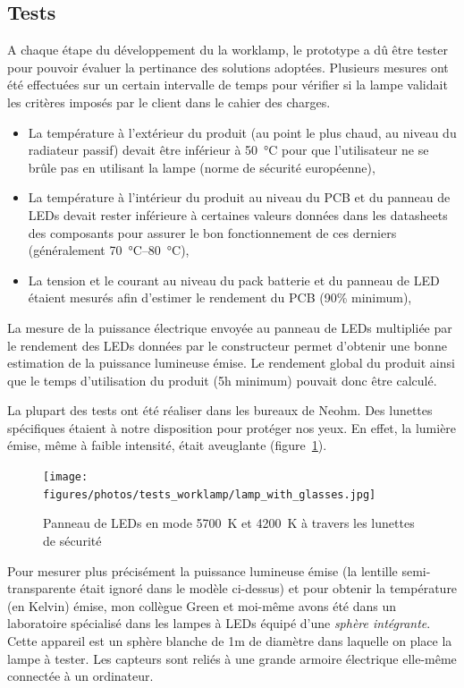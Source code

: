 \documentclass[a4paper, 12pt]{report}
\begin{document}
\subsection{Tests}
A chaque étape du développement du la worklamp, le prototype a dû  être tester pour pouvoir évaluer la pertinance des solutions adoptées. Plusieurs mesures ont été effectuées sur un certain intervalle de temps pour vérifier si la lampe validait les critères imposés par le client dans le cahier des charges.
\begin{itemize} %
\item La température à l'extérieur du produit (au point le plus chaud, au niveau du radiateur passif) devait être inférieur à \SI{50}{\celsius} pour que l'utilisateur ne se brûle pas en utilisant la lampe (norme de sécurité européenne),
\item La température à l'intérieur du produit au niveau du PCB et du panneau de LEDs devait rester inférieure à certaines valeurs données dans les datasheets des composants pour assurer le bon fonctionnement de ces derniers (généralement \SIrange{70}{80}{\celsius}),
\item La tension et le courant au niveau du pack batterie et du panneau de LED étaient mesurés afin d'estimer le rendement du PCB (90\% minimum),
\end{itemize}
La mesure de la puissance électrique envoyée au panneau de LEDs multipliée par le rendement des LEDs données par le constructeur permet d'obtenir une bonne estimation de la puissance lumineuse émise. Le rendement global du produit ainsi que le temps d'utilisation du produit (5h minimum) pouvait donc être calculé.

La plupart des tests ont été réaliser dans les bureaux de Neohm. Des lunettes spécifiques étaient à notre disposition pour protéger nos yeux. En effet, la lumière émise, même à faible intensité, était aveuglante (figure~\ref{fig:lamp_with_glasses}).

\begin{figure}[h]
\centering
\texttt{[image: figures/photos/tests\_worklamp/lamp\_with\_glasses.jpg]}
\caption{Panneau de LEDs en mode \SI{5700}{\kelvin} et \SI{4200}{\kelvin} à travers les lunettes de sécurité}
\label{fig:lamp_with_glasses}
\end{figure}

Pour mesurer plus précisément la puissance lumineuse émise (la lentille semi-transparente était ignoré dans le modèle ci-dessus) et pour obtenir la température (en Kelvin) émise, mon collègue Green et moi-même avons été dans un laboratoire spécialisé dans les lampes à LEDs équipé d'une \emph{sphère intégrante}. Cette appareil est un sphère blanche de 1m de diamètre dans laquelle on place la lampe à tester. Les capteurs sont reliés à une grande armoire électrique elle-même connectée à un ordinateur.
\end{document}
